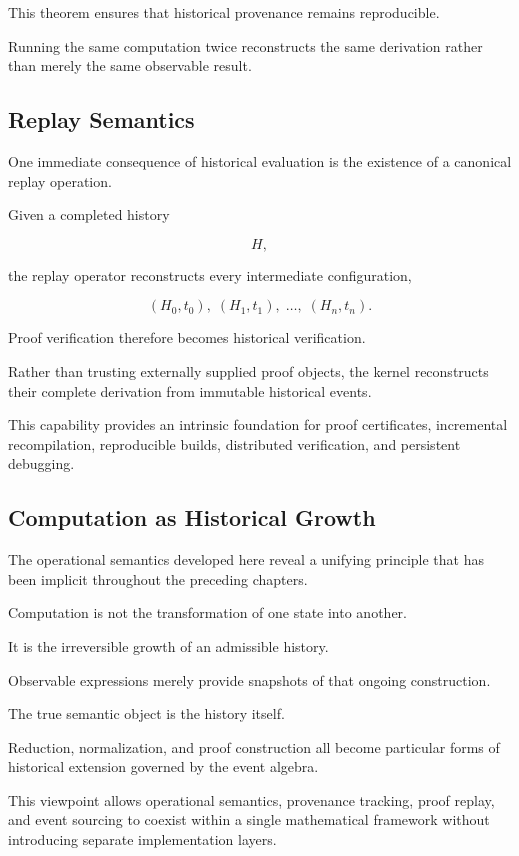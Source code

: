 \documentclass[12pt,oneside]{article}
\theoremstyle{definition}
\theoremstyle{remark}
\begin{document}
This theorem ensures that historical provenance remains reproducible.

Running the same computation twice reconstructs the same derivation rather than
merely the same observable result.

\subsection{Replay Semantics}

One immediate consequence of historical evaluation is the existence of a
canonical replay operation.

Given a completed history

\[
H,
\]

the replay operator reconstructs every intermediate configuration,

\[
(H_0,t_0),
\;
(H_1,t_1),
\;
\ldots,
\;
(H_n,t_n).
\]

Proof verification therefore becomes historical verification.

Rather than trusting externally supplied proof objects, the kernel reconstructs
their complete derivation from immutable historical events.

This capability provides an intrinsic foundation for proof certificates,
incremental recompilation, reproducible builds, distributed verification, and
persistent debugging.

\subsection{Computation as Historical Growth}

The operational semantics developed here reveal a unifying principle that has
been implicit throughout the preceding chapters.

Computation is not the transformation of one state into another.

It is the irreversible growth of an admissible history.

Observable expressions merely provide snapshots of that ongoing construction.

The true semantic object is the history itself.

Reduction, normalization, and proof construction all become particular forms of
historical extension governed by the event algebra.

This viewpoint allows operational semantics, provenance tracking, proof replay,
and event sourcing to coexist within a single mathematical framework without
introducing separate implementation layers.
\end{document}
